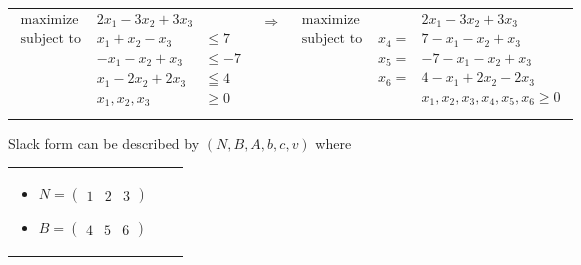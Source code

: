 \begin{enumerate}
\begin{scriptsize}
        \begin{tabular}{m{7cm}cm{7cm}}
            \begin{eqnarray*}
                \textrm{maximize } & 2x_1 - 3x_2 + 3x_3\\
                \textrm{subject to } & x_1 + x_2 - x_3 & \leq 7\\
                                     & -x_1 - x_2 + x_3 & \leq -7  \\
                                     & x_1 - 2x_2 + 2x_3 & \leqq 4 \\
                                     & x_1, x_2, x_3 & \geq 0\\
            \end{eqnarray*}
            & $\Rightarrow$ &
            \begin{eqnarray*}
                \textrm{maximize } & & 2x_1 - 3x_2 + 3x_3\\
                \textrm{subject to } & x_4 =& 7 - x_1 - x_2 + x_3   \\
                                     & x_5 =&  -7 - x_1 - x_2 + x_3   \\
                                     & x_6 =&  4 - x_1 + 2x_2 - 2x_3   \\
                                     & &x_1, x_2, x_3, x_4, x_5, x_6  \geq 0\\
            \end{eqnarray*}
        \end{tabular}
\end{scriptsize}


        Slack form can be described by $(N, B, A, b, c, v)$ where

        \begin{scriptsize}
            \begin{tabular}{m{5cm}m{5cm}m{5cm}}

        \begin{itemize}
            \item $N = 
                \begin{pmatrix}
                    1 & 2 & 3
                \end{pmatrix} $
            \item $B = 
                \begin{pmatrix}
                    4 & 5 & 6
                \end{pmatrix} $
            \end{itemize}
            &


\end{tabular}
\end{scriptsize}
\end{enumerate}
